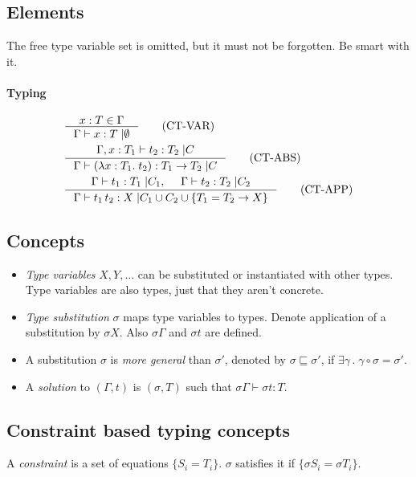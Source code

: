 \documentclass{article}
\newcommand{\lamt}[3]{\lambda #1: #2 .\;#3}
\newcommand{\app}[2]{#1\, #2}
\newcommand{\typjudc}[3]{\Gamma \vdash #1: #2 \;| #3}
\newcommand{\typjudcp}[3]{\Gamma \vdash \left(#1\right): #2 \;| #3}
\begin{document}
\subsection{Elements}
  \label{recontyp}
  The free type variable set is omitted, but it must not be forgotten.
  Be smart with it.

\paragraph{Typing}
  \begin{align*}
    & \inference
      {x:T \in \Gamma}
      {\typjudc{x}{T}{\emptyset}}
      \tag{CT-VAR} \\
    & \inference
      {\Gamma, x: T_1 \vdash t_2: T_2 \;| C}
      {\typjudcp{\lamt{x}{T_1}{t_2}}{T_1 \to T_2}{C}}
      \tag{CT-ABS} \\
    & \inference
      {\typjudc{t_1}{T_1}{C_1},& \typjudc{t_2}{T_2}{C_2}}
      {\typjudc{\app{t_1}{t_2}}{X}{C_1 \cup C_2 \cup \{T_1 = T_2 \to X\}}}
      \tag{CT-APP}
  \end{align*}

\subsection{Concepts}
  \begin{itemize}
    \item \emph{Type variables} $X, Y, \ldots$ can be substituted or instantiated with other types. Type variables are also types, just that they aren't concrete.
    \item \emph{Type substitution} $\sigma$ maps type variables to types. Denote application of a substitution by $\sigma X$. Also $\sigma \Gamma$ and $\sigma t$ are defined.
    \item A substitution $\sigma$ is \emph{more general} than $\sigma'$, denoted by $\sigma \sqsubseteq \sigma'$, if $\exists \gamma\, .\; \gamma \circ \sigma = \sigma'$.
    \item A \emph{solution} to $(\Gamma, t)$ is $(\sigma, T)$ such that $\sigma \Gamma \vdash \sigma t : T$.
  \end{itemize}

\subsection{Constraint based typing concepts}
  A \emph{constraint} is a set of equations $\{ S_i = T_i \}$. $\sigma$ satisfies it if $\{ \sigma S_i = \sigma T_i \}$.
\end{document}
